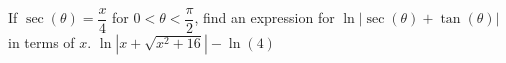 {If $\sec(\theta) = \dfrac{x}{4}$ for $0 < \theta < \dfrac{\pi}{2}$, find an expression for $\ln|\sec(\theta) + \tan(\theta)|$ in terms of $x$.}
{$\ln |x + \sqrt{x^{2} + 16}| - \ln(4)$}